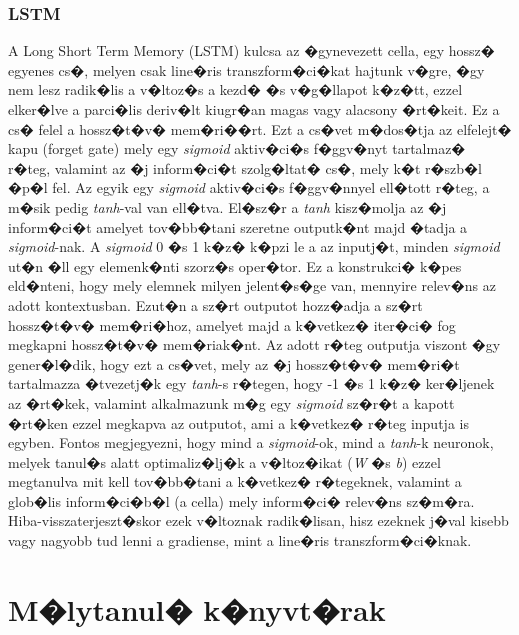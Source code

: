 \documentclass[12pt]{report}
\theoremstyle{definition}
\begin{document}
\subsection{LSTM}

A Long Short Term Memory (LSTM) kulcsa az �gynevezett cella, egy hossz� egyenes 
cs�, melyen csak line�ris transzform�ci�kat hajtunk v�gre, �gy nem lesz 
radik�lis a v�ltoz�s a kezd� �s v�g�llapot k�z�tt, ezzel elker�lve a parci�lis 
deriv�lt kiugr�an magas vagy alacsony �rt�keit. Ez a cs� felel a hossz�t�v� 
mem�ri��rt. Ezt a cs�vet m�dos�tja az elfelejt� kapu (forget gate) mely egy 
\textit{sigmoid} aktiv�ci�s f�ggv�nyt tartalmaz� r�teg, valamint az �j 
inform�ci�t szolg�ltat� cs�, mely k�t r�szb�l �p�l fel. Az egyik egy 
\textit{sigmoid} aktiv�ci�s f�ggv�nnyel ell�tott r�teg, a m�sik pedig 
\textit{tanh}-val van ell�tva. El�sz�r a \textit{tanh} kisz�molja az �j 
inform�ci�t amelyet tov�bb�tani szeretne outputk�nt majd �tadja a 
\textit{sigmoid}-nak. A \textit{sigmoid} 0 �s 1 k�z� k�pzi le a az inputj�t, 
minden \textit{sigmoid} ut�n �ll egy elemenk�nti szorz�s oper�tor. Ez a 
konstrukci� k�pes eld�nteni, hogy mely elemnek milyen jelent�s�ge van, mennyire 
relev�ns az adott kontextusban. Ezut�n a sz�rt outputot hozz�adja a sz�rt 
hossz�t�v� mem�ri�hoz, amelyet majd a k�vetkez� iter�ci� fog megkapni 
hossz�t�v� mem�riak�nt. Az adott r�teg outputja viszont �gy gener�l�dik, hogy 
ezt a cs�vet, mely az �j hossz�t�v� mem�ri�t tartalmazza �tvezetj�k egy 
\textit{tanh}-s r�tegen, hogy -1 �s 1 k�z� ker�ljenek az �rt�kek, valamint 
alkalmazunk m�g egy \textit{sigmoid} sz�r�t a kapott �rt�ken ezzel megkapva az 
outputot, ami a k�vetkez� r�teg inputja is egyben.
Fontos megjegyezni, hogy mind a \textit{sigmoid}-ok, mind a \textit{tanh}-k neuronok, melyek tanul�s alatt optimaliz�lj�k a v�ltoz�ikat (\textit{W} �s \textit{b}) ezzel megtanulva mit kell tov�bb�tani a k�vetkez� r�tegeknek, valamint a glob�lis inform�ci�b�l (a cella) mely inform�ci� relev�ns sz�m�ra. Hiba-visszaterjeszt�skor ezek v�ltoznak radik�lisan, hisz ezeknek j�val kisebb vagy nagyobb tud lenni a gradiense, mint a line�ris transzform�ci�knak.


\chapter{M�lytanul� k�nyvt�rak}
\end{document}
